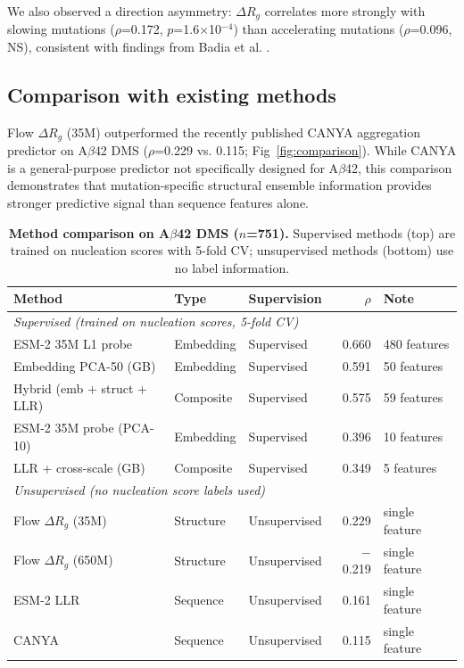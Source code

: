 \documentclass[10pt,letterpaper]{article}
\begin{document}
We also observed a direction asymmetry: $\Delta R_g$ correlates more strongly with slowing mutations ($\rho$=0.172, $p$=1.6$\times$10$^{-4}$) than accelerating mutations ($\rho$=0.096, NS), consistent with findings from Badia et al. \cite{badia2026}.

\subsection*{Comparison with existing methods}

Flow $\Delta R_g$ (35M) outperformed the recently published CANYA aggregation predictor \cite{thompson2025} on A$\beta$42 DMS ($\rho$=0.229 vs. 0.115; Fig~\ref{fig:comparison}). While CANYA is a general-purpose predictor not specifically designed for A$\beta$42, this comparison demonstrates that mutation-specific structural ensemble information provides stronger predictive signal than sequence features alone.

\begin{table}[h]
\centering
\caption{{\bf Method comparison on A$\beta$42 DMS ($n$=751).} Supervised methods (top) are trained on nucleation scores with 5-fold CV; unsupervised methods (bottom) use no label information.}
\begin{tabular}{lllrl}
\toprule
Method & Type & Supervision & $\rho$ & Note \\
\midrule
\multicolumn{5}{l}{\textit{Supervised (trained on nucleation scores, 5-fold CV)}} \\
ESM-2 35M L1 probe & Embedding & Supervised & 0.660 & 480 features \\
Embedding PCA-50 (GB) & Embedding & Supervised & 0.591 & 50 features \\
Hybrid (emb + struct + LLR) & Composite & Supervised & 0.575 & 59 features \\
ESM-2 35M probe (PCA-10) & Embedding & Supervised & 0.396 & 10 features \\
LLR + cross-scale (GB) & Composite & Supervised & 0.349 & 5 features \\
\midrule
\multicolumn{5}{l}{\textit{Unsupervised (no nucleation score labels used)}} \\
Flow $\Delta R_g$ (35M) & Structure & Unsupervised & 0.229 & single feature \\
Flow $\Delta R_g$ (650M) & Structure & Unsupervised & $-$0.219 & single feature \\
ESM-2 LLR & Sequence & Unsupervised & 0.161 & single feature \\
CANYA & Sequence & Unsupervised & 0.115 & single feature \\
\bottomrule
\end{tabular}
\label{tab:comparison}
\end{table}
\end{document}
